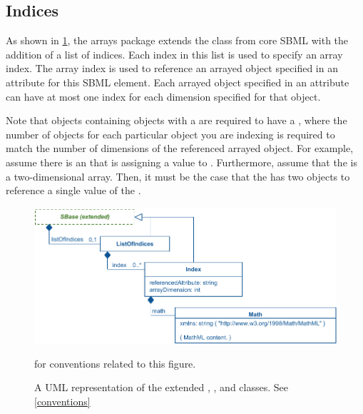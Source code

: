 \subsection{Indices}
\label{sec:index}

As shown in \ref{fig:indices_uml}, the arrays package extends the \SBase class from core SBML with the addition of a list of indices.
Each index in this list is used to specify an array index. The array index is used to reference an arrayed object specified in an attribute for this SBML element.
Each arrayed object specified in an attribute can have at most one index for each dimension specified for that object.

Note that \SBase objects containing   objects with a
\ListOfDimensions are required to have  a \ListOfIndices, where the number of
  \Index objects for each particular object you are indexing is required
  to match the number of dimensions of the referenced arrayed
  object. For example, assume there is an \AssignmentRule that is
  assigning a value to \Parameter. Furthermore, assume that
  the \Parameter is a two-dimensional array.  Then, it must be the case
  that the \Rule has two \Index objects to reference a single value of
  the \Parameter.
\begin{figure}[ht]
    \centering
    \includegraphics{images/indicesUML.pdf}
    \caption{A UML representation of the extended \SBase, \ListOfIndices, and \Index classes. See \ref{conventions}} for conventions related to this figure.
    \label{fig:indices_uml}
\end{figure}

